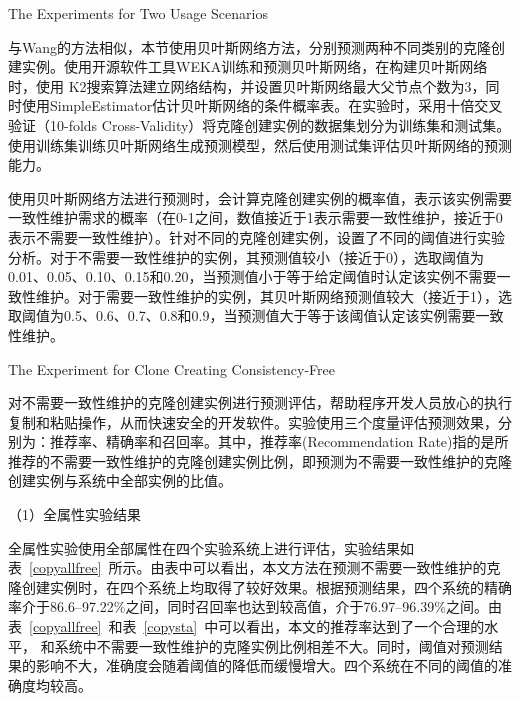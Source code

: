 {The Experiments for Two Usage Scenarios}

与Wang的方法相似，本节使用贝叶斯网络方法，分别预测两种不同类别的克隆创建实例。使用开源软件工具WEKA训练和预测贝叶斯网络，在构建贝叶斯网络时，使用 K2搜索算法建立网络结构，并设置贝叶斯网络最大父节点个数为3，同时使用SimpleEstimator估计贝叶斯网络的条件概率表。在实验时，采用十倍交叉验证（10-folds Cross-Validity）将克隆创建实例的数据集划分为训练集和测试集。使用训练集训练贝叶斯网络生成预测模型，然后使用测试集评估贝叶斯网络的预测能力。

使用贝叶斯网络方法进行预测时，会计算克隆创建实例的概率值，表示该实例需要一致性维护需求的概率（在0-1之间，数值接近于1表示需要一致性维护，接近于0表示不需要一致性维护）。针对不同的克隆创建实例，设置了不同的阈值进行实验分析。对于不需要一致性维护的实例，其预测值较小（接近于0），选取阈值为0.01、0.05、0.10、0.15和0.20，当预测值小于等于给定阈值时认定该实例不需要一致性维护。对于需要一致性维护的实例，其贝叶斯网络预测值较大（接近于1），选取阈值为0.5、0.6、0.7、0.8和0.9，当预测值大于等于该阈值认定该实例需要一致性维护。

{The Experiment for Clone Creating Consistency-Free}

对不需要一致性维护的克隆创建实例进行预测评估，帮助程序开发人员放心的执行复制和粘贴操作，从而快速安全的开发软件。实验使用三个度量评估预测效果，分别为：推荐率、精确率和召回率。其中，推荐率(Recommendation Rate)指的是所推荐的不需要一致性维护的克隆创建实例比例，即预测为不需要一致性维护的克隆创建实例与系统中全部实例的比值。


（1）全属性实验结果

全属性实验使用全部属性在四个实验系统上进行评估，实验结果如表~\ref{copyallfree}~所示。由表中可以看出，本文方法在预测不需要一致性维护的克隆创建实例时，在四个系统上均取得了较好效果。根据预测结果，四个系统的精确率介于86.6--97.22\%之间，同时召回率也达到较高值，介于76.97--96.39\%之间。由表~\ref{copyallfree}~和表~\ref{copysta}~中可以看出，本文的推荐率达到了一个合理的水平， 和系统中不需要一致性维护的克隆实例比例相差不大。同时，阈值对预测结果的影响不大，准确度会随着阈值的降低而缓慢增大。四个系统在不同的阈值的准确度均较高。

